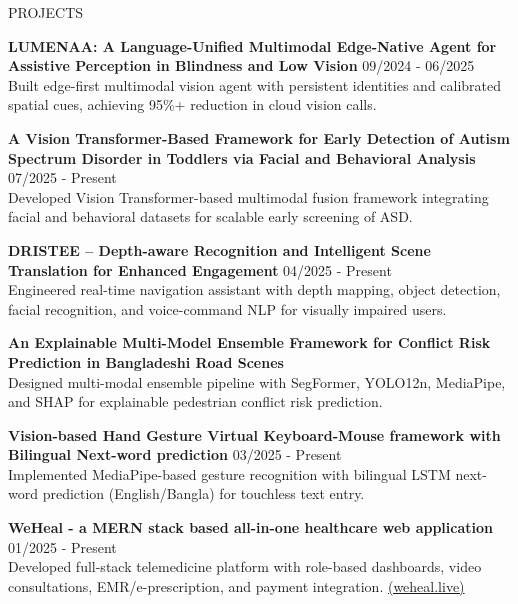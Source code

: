 \documentclass{resume} %
\begin{document}
\begin{rSection}{PROJECTS}
\vspace{-1.25em}
\item \textbf{LUMENAA: A Language-Unified Multimodal Edge-Native Agent for Assistive Perception in Blindness and Low Vision} \hfill 09/2024 - 06/2025\\
{Built edge-first multimodal vision agent with persistent identities and calibrated spatial cues, achieving 95\%+ reduction in cloud vision calls.}

\item \textbf{A Vision Transformer-Based Framework for Early Detection of Autism Spectrum Disorder in Toddlers via Facial and Behavioral Analysis} \hfill 07/2025 - Present\\
{Developed Vision Transformer-based multimodal fusion framework integrating facial and behavioral datasets for scalable early screening of ASD.}

\item \textbf{DRISTEE – Depth-aware Recognition and Intelligent Scene Translation for Enhanced Engagement} \hfill 04/2025 - Present\\
{Engineered real-time navigation assistant with depth mapping, object detection, facial recognition, and voice-command NLP for visually impaired users.}

\item \textbf{An Explainable Multi-Model Ensemble Framework for Conflict Risk Prediction in Bangladeshi Road Scenes}\\
{Designed multi-modal ensemble pipeline with SegFormer, YOLO12n, MediaPipe, and SHAP for explainable pedestrian conflict risk prediction.}

\item \textbf{Vision-based Hand Gesture Virtual Keyboard-Mouse framework with Bilingual Next-word prediction} \hfill 03/2025 - Present\\
{Implemented MediaPipe-based gesture recognition with bilingual LSTM next-word prediction (English/Bangla) for touchless text entry.}

\item \textbf{WeHeal - a MERN stack based all-in-one healthcare web application} \hfill 01/2025 - Present\\
{Developed full-stack telemedicine platform with role-based dashboards, video consultations, EMR/e-prescription, and payment integration. \href{https://weheal.live/}{(weheal.live)}}


\end{rSection}
\end{document}
